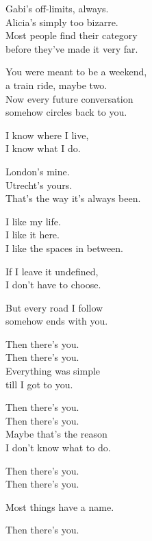 \begin{lyrics}
Gabi's off-limits, always.\\
Alicia's simply too bizarre.\\
Most people find their category\\
before they've made it very far.

You were meant to be a weekend,\\
a train ride, maybe two.\\
Now every future conversation\\
somehow circles back to you.

I know where I live,\\
I know what I do.

London's mine.\\
Utrecht's yours.\\
That's the way it's always been.

I like my life.\\
I like it here.\\
I like the spaces in between.

If I leave it undefined,\\
I don't have to choose.

But every road I follow\\
somehow ends with you.

Then there's you.\\
Then there's you.\\
Everything was simple\\
till I got to you.

Then there's you.\\
Then there's you.\\
Maybe that's the reason\\
I don't know what to do.

Then there's you.\\
Then there's you.

Most things have a name.

Then there's you.
\end{lyrics}

